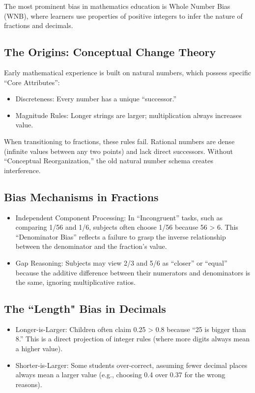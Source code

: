 The most prominent bias in mathematics education is Whole Number Bias (WNB), where learners use properties of positive integers to infer the nature of fractions and decimals.

\subsection{The Origins: Conceptual Change Theory}

Early mathematical experience is built on natural numbers, which possess specific “Core Attributes”:
\begin{itemize}
    \item Discreteness: Every number has a unique “successor.”
    \item Magnitude Rules: Longer strings are larger; multiplication always increases value.
\end{itemize}
When transitioning to fractions, these rules fail. Rational numbers are dense (infinite values between any two points) and lack direct successors. Without “Conceptual Reorganization,” the old natural number schema creates interference.

\subsection{Bias Mechanisms in Fractions}

\begin{itemize}
    \item Independent Component Processing: In “Incongruent” tasks, such as comparing 1/56 and 1/6, subjects often choose 1/56 because 56 > 6. This “Denominator Bias” reflects a failure to grasp the inverse relationship between the denominator and the fraction’s value.
    \item Gap Reasoning: Subjects may view 2/3 and 5/6 as “closer” or “equal” because the additive difference between their numerators and denominators is the same, ignoring multiplicative ratios.
\end{itemize}

\subsection{The ``Length" Bias in Decimals}

\begin{itemize}
    \item Longer-is-Larger: Children often claim 0.25 > 0.8 because “25 is bigger than 8.” This is a direct projection of integer rules (where more digits always mean a higher value).
    \item Shorter-is-Larger: Some students over-correct, assuming fewer decimal places always mean a larger value (e.g., choosing 0.4 over 0.37 for the wrong reasons).
\end{itemize}

